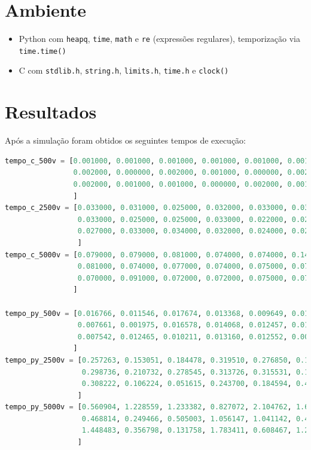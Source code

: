 \documentclass[12pt,a4paper]{report}
\begin{document}
\section*{Ambiente}
\begin{itemize}
    \item Python com \texttt{heapq}, \texttt{time}, \texttt{math} e \texttt{re} (expressões regulares), temporização via \texttt{time.time()}
    \item C com \texttt{stdlib.h}, \texttt{string.h}, \texttt{limits.h}, \texttt{time.h} e \texttt{clock()}
\end{itemize}

\section*{Resultados}
Após a simulação foram obtidos os seguintes tempos de execução:
\begin{lstlisting}[language=Python, caption= Tempos de Execução, basicstyle=\tiny]
tempo_c_500v = [0.001000, 0.001000, 0.001000, 0.001000, 0.001000, 0.001000, 0.001000, 0.001000, 0.002000, 0.001000,
                0.002000, 0.000000, 0.002000, 0.001000, 0.000000, 0.002000, 0.000000, 0.001000, 0.001000, 0.001000,
                0.002000, 0.001000, 0.001000, 0.000000, 0.002000, 0.001000, 0.001000, 0.001000, 0.000000, 0.002000
                ]
tempo_c_2500v = [0.033000, 0.031000, 0.025000, 0.032000, 0.033000, 0.030000, 0.019000, 0.031000, 0.028000, 0.016000,
                 0.033000, 0.025000, 0.025000, 0.033000, 0.022000, 0.029000, 0.014000, 0.026000, 0.030000, 0.026000,
                 0.027000, 0.033000, 0.034000, 0.032000, 0.024000, 0.024000, 0.026000, 0.028000, 0.023000, 0.025000
                 ]
tempo_c_5000v = [0.079000, 0.079000, 0.081000, 0.074000, 0.074000, 0.145000, 0.066000, 0.065000, 0.075000, 0.066000,
                 0.081000, 0.074000, 0.077000, 0.074000, 0.075000, 0.073000, 0.081000, 0.072000, 0.073000, 0.079000,
                 0.070000, 0.091000, 0.072000, 0.072000, 0.075000, 0.075000, 0.074000, 0.074000, 0.074000, 0.063000
                ]

tempo_py_500v = [0.016766, 0.011546, 0.017674, 0.013368, 0.009649, 0.012738, 0.010895, 0.004226, 0.007728, 0.011580,
                 0.007661, 0.001975, 0.016578, 0.014068, 0.012457, 0.011945, 0.007076, 0.010749, 0.019350, 0.006499,
                 0.007542, 0.012465, 0.010211, 0.013160, 0.012552, 0.003705, 0.017359, 0.015390, 0.014620, 0.014852
                ]
tempo_py_2500v = [0.257263, 0.153051, 0.184478, 0.319510, 0.276850, 0.124794, 0.035414, 0.288510, 0.164211, 0.273675,
                  0.298736, 0.210732, 0.278545, 0.313726, 0.315531, 0.199445, 0.320459, 0.100062, 0.104913, 0.064756,
                  0.308222, 0.106224, 0.051615, 0.243700, 0.184594, 0.405185, 0.310464, 0.159756, 0.023914, 0.154531
                 ]
tempo_py_5000v = [0.560904, 1.228559, 1.233382, 0.827072, 2.104762, 1.627338, 1.357748, 0.199732, 0.274592, 0.999782,
                  0.468814, 0.249466, 0.505003, 1.056147, 1.041142, 0.450411, 1.102306, 1.448330, 1.794473, 1.456239,
                  1.448483, 0.356798, 0.131758, 1.783411, 0.608467, 1.223389, 0.084121, 1.133065, 1.112486, 0.192759
                 ]
\end{lstlisting}
\end{document}
